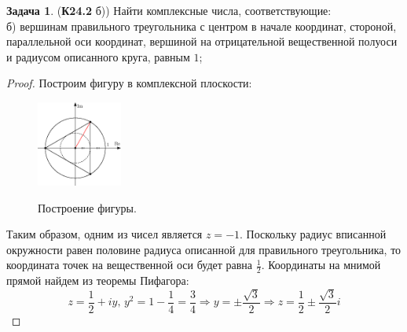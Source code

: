 \documentclass[12pt]{article}
\theoremstyle{definition}
\newtheorem{problem}{Задача}
\begin{document}
\begin{problem}(\textbf{К24.2} б))
	Найти комплексные числа, соответствующие:\\
	б) вершинам правильного треугольника с центром в начале координат, стороной, параллельной оси координат, вершиной на отрицательной вещественной полуоси и радиусом описанного круга, равным $1$;
\end{problem}
\begin{proof}
	Построим фигуру в комплексной плоскости:
	\begin{figure}[H]
		\centering
		\includegraphics[width=0.25\textwidth]{AL1S1_HW_1.eps}
		\label{1_1}
		\caption{Построение фигуры.}
	\end{figure}
	Таким образом, одним из чисел является $z = -1$. Поскольку радиус вписанной окружности равен половине радиуса описанной для правильного треугольника, то координата точек на вещественной оси будет равна $\tfrac{1}{2}$. Координаты на мнимой прямой найдем из теоремы Пифагора:
	$$
		z = \dfrac{1}{2} + iy, \, y^2 = 1 - \dfrac{1}{4} = \dfrac{3}{4} \Rightarrow y = \pm \dfrac{\sqrt{3}}{2} \Rightarrow z = \dfrac{1}{2}\pm \dfrac{\sqrt{3}}{2}i
	$$
\end{proof}
\end{document}
